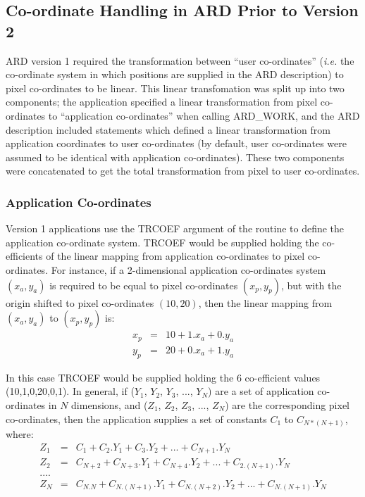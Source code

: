 \subsection{Co-ordinate Handling in ARD Prior to Version 2}

ARD version 1 required the transformation between ``user co-ordinates''
({\em i.e.} the co-ordinate system in which positions are supplied in the
ARD description) to pixel co-ordinates to be linear. This linear
transfomation was split up into two components; the application specified
a linear transformation from pixel co-ordinates to ``application
co-ordinates'' when calling ARD\_WORK, and the ARD description included
statements which defined a linear transformation from application
coordinates to user co-ordinates (by default, user co-ordinates were
assumed to be identical with application co-ordinates). These two
components were concatenated to get the total transformation from pixel
to user co-ordinates.

\subsubsection{Application Co-ordinates}
Version 1 applications use the TRCOEF argument of the  
routine to define the application co-ordinate system. TRCOEF would be supplied 
holding the
co-efficients of the linear mapping from application co-ordinates to pixel
co-ordinates. For instance, if a 2-dimensional application co-ordinates system
$(x_{a},y_{a})$ is required to be equal to pixel co-ordinates $(x_{p},y_{p})$,
but with the origin shifted to pixel co-ordinates $(10,20)$, then the linear
mapping from $(x_{a},y_{a})$ to $(x_{p},y_{p})$ is:
\small
\begin{eqnarray*}
x_{p} & = & 10 + 1.x_{a} + 0.y_{a} \\
y_{p} & = & 20 + 0.x_{a} + 1.y_{a} 
\end{eqnarray*}
\normalsize

In this case TRCOEF would be supplied holding the 6 co-efficient values
(10,1,0,20,0,1). In general, if ($Y_{1}$, $Y_{2}$, $Y_{3}$, ..., $Y_{N}$) are a
set of application co-ordinates in $N$ dimensions, and ($Z_{1}$, $Z_{2}$,
$Z_{3}$, ..., $Z_{N}$) are the corresponding pixel co-ordinates, then the
application supplies a set of constants $C_{1}$ to $C_{N*(N+1)}$, where: 
\small
\begin{eqnarray*}
Z_{1} & = & C_{1} + C_{2}.Y_{1} + C_{3}.Y_{2} + ... + C_{N+1}.Y_{N} \\
Z_{2} & = & C_{N+2} + C_{N+3}.Y_{1} + C_{N+4}.Y_{2} + ... + C_{2.(N+1)}.Y_{N} \\
 ....\\
Z_{N} & = & C_{N.N} + C_{N.(N+1)}.Y_{1} + C_{N.(N+2)}.Y_{2} + ... + C_{N.(N+1)}.Y_{N} 
\end{eqnarray*}
\normalsize

